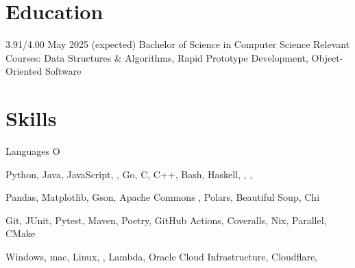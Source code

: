 \section{Education}
\begin{doutline}
      3.91/4.00
    \hfill May 2025 (expected)
        \2 Bachelor of Science in Computer Science
        \2 Relevant Courses: Data Structures \& Algorithms, Rapid Prototype Development, Object-Oriented Software
\end{doutline}

\section{Skills}
\begin{labeling}{Languages O}
    \item [Languages] Python, Java, JavaScript, , Go, C, C++, Bash, Haskell, , , \textsmaller{\LaTeX}
    \item [Libraries] Pandas, Matplotlib, Gson, Apache Commons , Polars, Beautiful Soup, Chi
    \item [Tools] Git, JUnit, Pytest, Maven, Poetry, GitHub Actions, Coveralls, Nix,  Parallel, CMake
    \item [Platforms] Windows, mac, Linux, ,  Lambda, Oracle Cloud Infrastructure, Cloudflare, 
\end{labeling}

